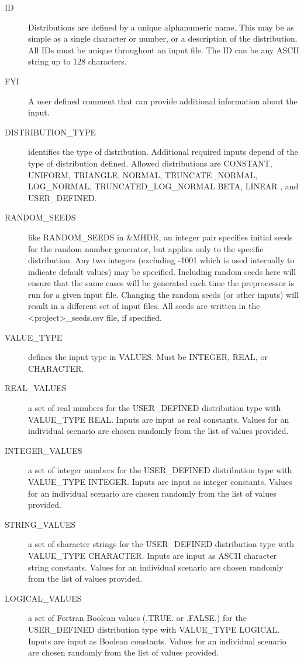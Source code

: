 \documentclass[12pt,twoside]{book}
\begin{document}
\begin{description}
  \item[ID] Distributions are defined by a unique alphanumeric name. This may be as simple as a single character or number, or a description of the distribution. All IDs must be unique throughout an input file. The { \ct ID} can be any ASCII string up to 128 characters.
  \item[FYI] A user defined comment that can provide additional information about the input.
  \item[DISTRIBUTION\_TYPE] identifies the type of distribution. Additional required inputs depend of the type of distribution defined. Allowed distributions are {\ct CONSTANT},  {\ct UNIFORM}, {\ct TRIANGLE}, {\ct NORMAL}, {\ct TRUNCATE\_NORMAL}, {\ct LOG\_NORMAL}, {\ct TRUNCATED\_LOG\_NORMAL} {\ct BETA}, {\ct LINEAR }, and {\ct USER\_DEFINED}.
  \item[RANDOM\_SEEDS] like {\ct RANDOM\_SEEDS} in {\ct \&MHDR}, an integer pair specifies initial seeds for the random number generator, but applies only to the specific distribution. Any two integers (excluding -1001 which is used internally to indicate default values) may be specified. Including random seeds here will ensure that the same cases will be generated each time the preprocessor is run for a given input file. Changing the random seeds (or other inputs) will result in a different set of input files. All seeds are written in the {\ct <project>\_seeds.csv} file, if specified.
  \item[VALUE\_TYPE] defines the input type in VALUES. Must be {\ct INTEGER}, {\ct REAL}, or {\ct CHARACTER}.
  \item[REAL\_VALUES] a set of real numbers for the {\ct USER\_DEFINED} distribution type with {\ct VALUE\_TYPE} {\ct REAL}. Inputs are input as real constants. Values for an individual scenario are chosen randomly from the list of values provided.
  \item[INTEGER\_VALUES] a set of integer numbers for the {\ct USER\_DEFINED} distribution type with {\ct VALUE\_TYPE} {\ct INTEGER}. Inputs are input as integer constants. Values for an individual scenario are chosen randomly from the list of values provided.
  \item[STRING\_VALUES] a set of character strings for the {\ct USER\_DEFINED} distribution type with {\ct VALUE\_TYPE} {\ct CHARACTER}. Inputs are input as ASCII character string constants. Values for an individual scenario are chosen randomly from the list of values provided.
  \item[LOGICAL\_VALUES] a set of Fortran Boolean values (.TRUE. or .FALSE.) for the {\ct USER\_DEFINED} distribution type with {\ct VALUE\_TYPE} {\ct LOGICAL}. Inputs are input as Boolean constants. Values for an individual scenario are chosen randomly from the list of values provided.

\end{description}
\end{document}
